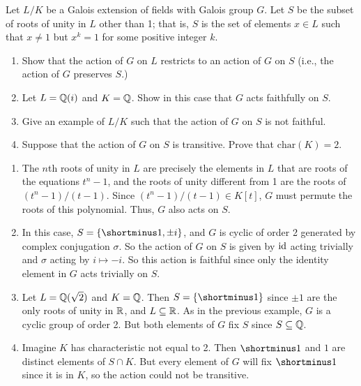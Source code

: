 \begin{question}[subtitle = {August 2019 Problem 3, edited},ID=Aug19_3]
Let $L/K$ be a Galois extension of fields with Galois group $G$. Let $S$ be the subset of roots of unity in $L$ other than 1; that is, $S$ is the set of elements $x\in L$ such that $x \neq 1$ but $x^k = 1$ for some positive integer $k$.
\begin{enumerate}
    \item Show that the action of $G$ on $L$ restricts to an action of $G$ on $S$ (i.e., the action of $G$ preserves $S$.)
    \item Let $L=\mathbb{Q}(i)$ and $K=\mathbb{Q}$. Show in this case that $G$ acts faithfully on $S$.
    \item Give an example of $L/K$ such that the action of $G$ on $S$ is not faithful.
    \item Suppose that the action of $G$ on $S$ is transitive. Prove that $\mathrm{char}(K)=2$.
\end{enumerate}
\end{question}
\begin{solution}
\begin{enumerate}
    \item The $n$th roots of unity in $L$ are precisely the elements in $L$ that are roots of the equations $t^n-1$, and the roots of unity different from 1 are the roots of $(t^n-1)/(t-1)$. Since $(t^n-1)/(t-1) \in K[t]$, $G$ must permute the roots of this polynomial. Thus, $G$ also acts on $S$.
    \item In this case, $S = \set{\shortminus 1, \pm i}$, and $G$ is cyclic of order 2 generated by complex conjugation $\sigma$. So the action of $G$ on $S$ is given by $\operatorname{id}$ acting trivially and $\sigma$ acting by $i \mapsto -i$. So this action is faithful since only the identity element in $G$ acts trivially on $S$.
    \item Let $L = \mathbb{Q}(\sqrt{2})$ and $K = \mathbb{Q}$. Then $S = \set{\shortminus 1}$ since $\pm 1$ are the only roots of unity in $\mathbb{R}$, and $L \subseteq \mathbb{R}$. As in the previous example, $G$ is a cyclic group of order 2. But both elements of $G$ fix $S$ since $S \subseteq \mathbb{Q}$.
    \item Imagine $K$ has characteristic not equal to 2. Then $\shortminus 1$ and $1$ are distinct elements of $S \cap K$. But every element of $G$ will fix $\shortminus 1$ since it is in $K$, so the action could not be transitive.
\end{enumerate}
\end{solution}

